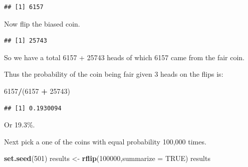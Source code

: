 \documentclass[
]{book}
\newenvironment{Shaded}{\begin{snugshade}}{\end{snugshade}}
\newcommand{\DataTypeTok}[1]{\textcolor[rgb]{0.13,0.29,0.53}{#1}}
\newcommand{\DecValTok}[1]{\textcolor[rgb]{0.00,0.00,0.81}{#1}}
\newcommand{\FloatTok}[1]{\textcolor[rgb]{0.00,0.00,0.81}{#1}}
\newcommand{\KeywordTok}[1]{\textcolor[rgb]{0.13,0.29,0.53}{\textbf{#1}}}
\newcommand{\NormalTok}[1]{#1}
\newcommand{\OperatorTok}[1]{\textcolor[rgb]{0.81,0.36,0.00}{\textbf{#1}}}
\newcommand{\OtherTok}[1]{\textcolor[rgb]{0.56,0.35,0.01}{#1}}
\newcommand{\StringTok}[1]{\textcolor[rgb]{0.31,0.60,0.02}{#1}}
\begin{document}
\begin{verbatim}
## [1] 6157
\end{verbatim}

Now flip the biased coin.

\begin{Shaded}
\end{Shaded}

\begin{verbatim}
## [1] 25743
\end{verbatim}

So we have a total 6157 + 25743 heads of which 6157 came from the fair coin.

Thus the probability of the coin being fair given 3 heads on the flips is:

\begin{Shaded}
\begin{Highlighting}[]
\DecValTok{6157}\OperatorTok{/}\NormalTok{(}\DecValTok{6157} \OperatorTok{+}\StringTok{ }\DecValTok{25743}\NormalTok{)}
\end{Highlighting}
\end{Shaded}

\begin{verbatim}
## [1] 0.1930094
\end{verbatim}

Or 19.3\%.

Next pick a one of the coins with equal probability 100,000 times.

\begin{Shaded}
\begin{Highlighting}[]
\KeywordTok{set.seed}\NormalTok{(}\DecValTok{501}\NormalTok{)}
\NormalTok{results <-}\StringTok{ }\KeywordTok{rflip}\NormalTok{(}\DecValTok{100000}\NormalTok{,}\DataTypeTok{summarize =} \OtherTok{TRUE}\NormalTok{)}
\NormalTok{results}
\end{Highlighting}
\end{Shaded}
\end{document}
